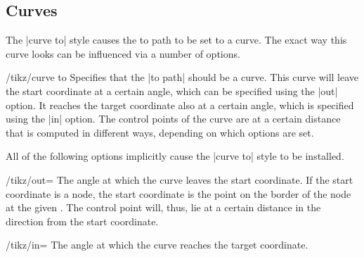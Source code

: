 \subsection{Curves}

The |curve to| style causes the to path to be set to a curve. The exact way
this curve looks can be influenced via a number of options.

\begin{key}{/tikz/curve to}
    Specifies that the |to path| should be a curve. This curve will leave the
    start coordinate at a certain angle, which can be specified using the |out|
    option. It reaches the target coordinate also at a certain angle, which is
    specified using the |in| option. The control points of the curve are at a
    certain distance that is computed in different ways, depending on which
    options are set.

    All of the following options implicitly cause the |curve to| style to be
    installed.

    \begin{key}{/tikz/out=}
        The angle at which the curve leaves the start coordinate. If the start
        coordinate is a node, the start coordinate is the point on the border
        of the node at the given . The control point will, thus,
        lie at a certain distance in the direction  from the start
        coordinate.
\begin{codeexample}[]
\end{codeexample}
    \end{key}
    \begin{key}{/tikz/in=}
        The angle at which the curve reaches the target coordinate.
    \end{key}


\end{key}
